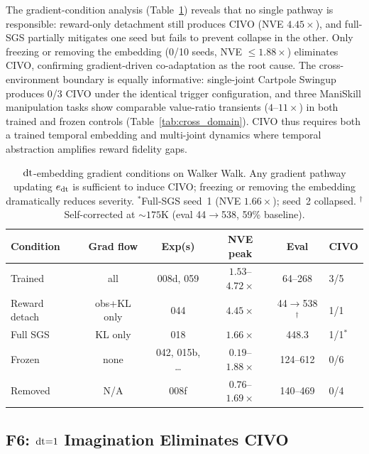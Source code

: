  The gradient-condition analysis (Table~\ref{tab:three_way_emb}) reveals that no single pathway is responsible: reward-only detachment still produces CIVO (NVE $4.45\times$), and full-SGS partially mitigates one seed but fails to prevent collapse in the other. Only freezing or removing the embedding (0/10 seeds, NVE ${\leq}1.88\times$) eliminates CIVO, confirming gradient-driven co-adaptation as the root cause. The cross-environment boundary is equally informative: single-joint Cartpole Swingup produces 0/3 CIVO under the identical trigger configuration, and three ManiSkill manipulation tasks show comparable value-ratio transients ($4$--$11\times$) in both trained and frozen controls (Table~\ref{tab:cross_domain}). CIVO thus requires both a trained temporal embedding and multi-joint dynamics where temporal abstraction amplifies reward fidelity gaps.

\begin{table}[t]
\centering
\caption{$\mathrm{dt}$-embedding gradient conditions on Walker Walk. Any gradient pathway updating $e_{\mathrm{dt}}$ is sufficient to induce CIVO; freezing or removing the embedding dramatically reduces severity. $^*$Full-SGS seed~1 (NVE $1.66\times$); seed~2 collapsed. $^\dagger$Self-corrected at ${\sim}175$K (eval 44$\to$538, 59\% baseline).}
\label{tab:three_way_emb}
\footnotesize
\begin{tabular}{lccccl}
\toprule
Condition & Grad flow & Exp(s) & NVE peak & Eval & CIVO \\
\midrule
Trained & all & 008d, 059 & $1.53$--$4.72\times$ & 64--268 & 3/5 \\
Reward detach & obs+KL only & 044 & $4.45\times$ & 44$\to$538$^\dagger$ & 1/1 \\
Full SGS & KL only & 018 & $1.66\times$ & 448.3 & 1/1$^*$ \\
Frozen & none & 042, 015b, \ldots & $0.19$--$1.88\times$ & 124--612 & 0/6 \\
Removed & N/A & 008f & $0.76$--$1.69\times$ & 140--469 & 0/4 \\
\bottomrule
\end{tabular}
\end{table}


\subsection{F6: $\mathrm{dt}{=}1$ Imagination Eliminates CIVO}
\label{sec:f6}

